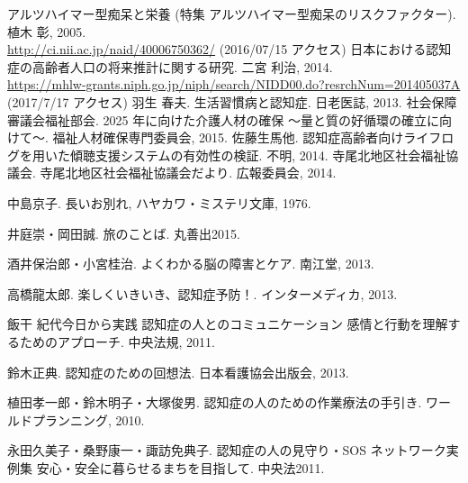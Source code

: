 \documentclass[openany,11pt,papersize]{jsbook}
\begin{document}

\begin{thebibliography}{9}
      アルツハイマー型痴呆と栄養 (特集 アルツハイマー型痴呆のリスクファクター). 植木 彰, 2005. \\ \url{http://ci.nii.ac.jp/naid/40006750362/} (2016/07/15 アクセス)
     日本における認知症の高齢者人口の将来推計に関する研究. 二宮 利治, 2014. \\ \url{https://mhlw-grants.niph.go.jp/niph/search/NIDD00.do?resrchNum=201405037A} (2017/7/17 アクセス)
     羽生 春夫. 生活習慣病と認知症. 日老医誌, 2013.
     社会保障審議会福祉部会. 2025 年に向けた介護人材の確保 ～量と質の好循環の確立に向けて～. 福祉人材確保専門委員会, 2015.
     佐藤生馬他. 認知症高齢者向けライフログを用いた傾聴支援システムの有効性の検証. 不明, 2014.
     寺尾北地区社会福祉協議会. 寺尾北地区社会福祉協議会だより. 広報委員会, 2014.
    \item[]
    \item[] 中島京子. 長いお別れ, ハヤカワ・ミステリ文庫, 1976.
    \item[] 井庭崇・岡田誠. 旅のことば. 丸善出2015.
    \item[] 酒井保治郎・小宮桂治. よくわかる脳の障害とケア. 南江堂, 2013.
    \item[] 高橋龍太郎. 楽しくいきいき、認知症予防！. インターメディカ, 2013.
    \item[] 飯干 紀代今日から実践 認知症の人とのコミュニケーション 感情と行動を理解するためのアプローチ. 中央法規, 2011.
    \item[] 鈴木正典. 認知症のための回想法. 日本看護協会出版会, 2013.
    \item[] 植田孝一郎・鈴木明子・大塚俊男. 認知症の人のための作業療法の手引き. ワールドプランニング, 2010.
    \item[] 永田久美子・桑野康一・諏訪免典子. 認知症の人の見守り・SOS ネットワーク実例集 安心・安全に暮らせるまちを目指して. 中央法2011.
\end{thebibliography}
\end{document}
